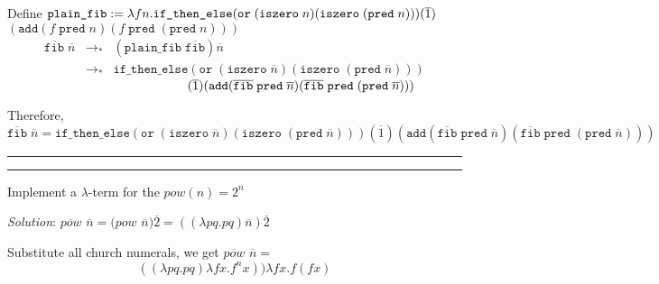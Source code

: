 \documentclass[a4paper, 11pt]{article}
\newcommand{\question}[2] {\vspace{.25in} \hrule\vspace{0.5em}
	\noindent{\bf #1: #2} \vspace{0.5em}
	\hrule \vspace{.10in}}
\newcommand\tab[1][1cm]{\hspace*{#1}}
\begin{document}
	Define $\texttt{plain\_fib} := \lambda fn.\texttt{if\_then\_else}
	(\texttt{or}\; (\texttt{iszero}\;n)(\texttt{iszero}\;(\texttt{pred}\;n)))
	(\overline{1})\\$
	\tab[3.5cm] $(\texttt{add} (f\;\texttt{pred}\; n) (f\;\texttt{pred}\;(\texttt{pred}\;n) ))
	$
	\begin{eqnarray}
	\overline{\texttt{fib} }\;\overline{n} &\rightarrow_*& (\texttt{plain\_fib} \; \overline{\texttt{fib}}) \overline{n}\\
	&\rightarrow_*& \texttt{if\_then\_else}
	(\texttt{or}\; (\texttt{iszero}\;\overline{n})(\texttt{iszero}\;(\texttt{pred}\;\overline{n})))
	\end{eqnarray}
	$\tab[5cm] (\overline{1})(\texttt{add} (\overline{\texttt{fib} }\;\texttt{pred}\; \overline{n}) (\overline{\texttt{fib} }\;\texttt{pred}\;(\texttt{pred}\;\overline{n}) ))$
	
	Therefore,
	$$\overline{\texttt{fib} }\;\overline{n} = \texttt{if\_then\_else}
	(\texttt{or}\; (\texttt{iszero}\;\overline{n})(\texttt{iszero}\;(\texttt{pred}\;\overline{n})))
 (\overline{1})(\texttt{add} (\overline{\texttt{fib} }\;\texttt{pred}\; \overline{n}) (\overline{\texttt{fib} }\;\texttt{pred}\;(\texttt{pred}\;\overline{n}) ))$$
	\question{9}{Power Of 2}

	Implement a  $ \lambda $-term for the $pow(n) = 2^n$
	
	{\em Solution}: $\overline{pow}$ $\overline{n} 
	=  (pow$ $\overline{n}) \overline{2} 
	=  ((\lambda p q . p q) \overline{n}) \overline{2} 
	$
	
	Substitute all church numerals, we get  $\overline{pow}$ $\overline{n} =$
	$$  ((\lambda p q . p q) \lambda f x. f^n x)) \lambda f x. f ( f x) $$
	
	
\end{document}
